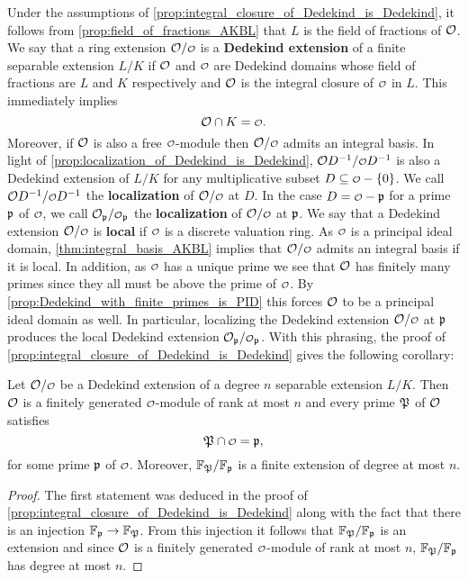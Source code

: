     Under the assumptions of \cref{prop:integral_closure_of_Dedekind_is_Dedekind}, it follows from \cref{prop:field_of_fractions_AKBL} that $L$ is the field of fractions of $\mathcal{O}$. We say that a ring extension $\mc{O}/\smc{O}$ is a \textbf{Dedekind extension} of a finite separable extension $L/K$ if $\mathcal{O}$ and $\smc{O}$ are Dedekind domains whose field of fractions are $L$ and $K$ respectively and $\mathcal{O}$ is the integral closure of $\smc{O}$ in $L$. This immediately implies
    \[
      \mc{O} \cap K = \smc{O}.
    \]
    Moreover, if $\mathcal{O}$ is also a free $\smc{O}$-module then $\mc{O}/\smc{O}$ admits an integral basis. In light of \cref{prop:localization_of_Dedekind_is_Dedekind}, $\mc{O}D^{-1}/\smc{O}D^{-1}$ is also a Dedekind extension of $L/K$ for any multiplicative subset $D \subseteq \smc{O}-\{0\}$. We call $\mc{O}D^{-1}/\smc{O}D^{-1}$ the \textbf{localization} of $\mc{O}/\smc{O}$ at $D$. In the case $D = \smc{O}-\mf{p}$ for a prime $\mathfrak{p}$ of $\smc{O}$, we call $\mc{O}_{\mf{p}}/\smc{O}_{\mf{p}}$ the \textbf{localization} of $\mc{O}/\smc{O}$ at $\mathfrak{p}$. We say that a Dedekind extension $\mc{O}/\smc{O}$ is \textbf{local} if $\smc{O}$ is a discrete valuation ring. As $\smc{O}$ is a principal ideal domain, \cref{thm:integral_basis_AKBL} implies that $\mc{O}/\smc{O}$ admits an integral basis if it is local. In addition, as $\smc{O}$ has a unique prime we see that $\mathcal{O}$ has finitely many primes since they all must be above the prime of $\smc{O}$. By \cref{prop:Dedekind_with_finite_primes_is_PID} this forces $\mathcal{O}$ to be a principal ideal domain as well. In particular, localizing the Dedekind extension $\mc{O}/\smc{O}$ at $\mathfrak{p}$ produces the local Dedekind extension $\mc{O}_{\mf{p}}/\smc{O}_{\mf{p}}$. With this phrasing, the proof of \cref{prop:integral_closure_of_Dedekind_is_Dedekind} gives the following corollary:

    \begin{corollary}\label{cor:integral_closure_of_Dedekind_is_Dedekind}
      Let $\mc{O}/\smc{O}$ be a Dedekind extension of a degree $n$ separable extension $L/K$. Then $\mathcal{O}$ is a finitely generated $\smc{O}$-module of rank at most $n$ and every prime $\mathfrak{P}$ of $\mathcal{O}$ satisfies
      \[
        \mf{P} \cap \smc{O} = \mf{p},
      \]
      for some prime $\mathfrak{p}$ of $\smc{O}$. Moreover, $\mathbb{F}_{\mathfrak{P}}/\mathbb{F}_{\mathfrak{p}}$ is a finite extension of degree at most $n$.
    \end{corollary}
    \begin{proof}
      The first statement was deduced in the proof of \cref{prop:integral_closure_of_Dedekind_is_Dedekind} along with the fact that there is an injection $\mathbb{F}_{\mathfrak{p}} \to \mathbb{F}_{\mathfrak{P}}$. From this injection it follows that $\mathbb{F}_{\mathfrak{P}}/\mathbb{F}_{\mathfrak{p}}$ is an extension and since $\mathcal{O}$ is a finitely generated $\smc{O}$-module of rank at most $n$, $\mathbb{F}_{\mathfrak{P}}/\mathbb{F}_{\mathfrak{p}}$ has degree at most $n$.
    \end{proof}

